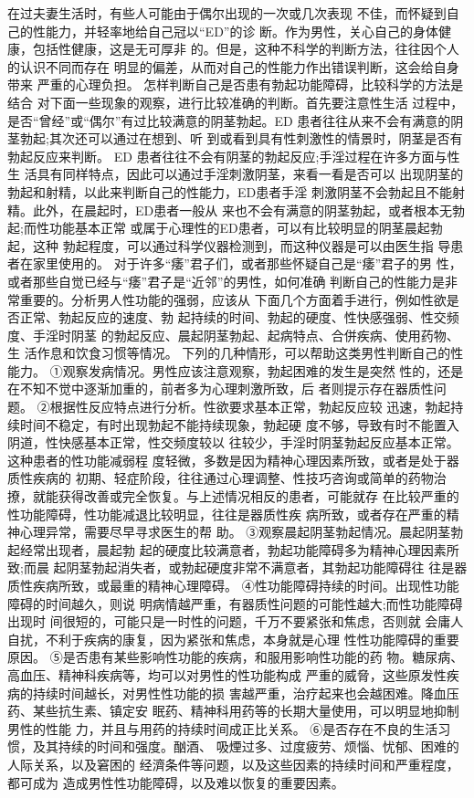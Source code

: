\documentclass[12pt,UTF8]{ctexbook}
\begin{document}
在过夫妻生活时，有些人可能由于偶尔出现的一次或几次表现
不佳，而怀疑到自己的性能力，并轻率地给自己冠以“ED”的诊
断。作为男性，关心自己的身体健康，包括性健康，这是无可厚非
的。但是，这种不科学的判断方法，往往因个人的认识不同而存在
明显的偏差，从而对自己的性能力作出错误判断，这会给自身带来
严重的心理负担。
怎样判断自己是否患有勃起功能障碍，比较科学的方法是结合
对下面一些现象的观察，进行比较准确的判断。首先要注意性生活
过程中，是否“曾经”或“偶尔”有过比较满意的阴茎勃起。ED
患者往往从来不会有满意的阴茎勃起;其次还可以通过在想到、听
到或看到具有性刺激性的情景时，阴茎是否有勃起反应来判断。
ED 患者往往不会有阴茎的勃起反应;手淫过程在许多方面与性生
活具有同样特点，因此可以通过手淫刺激阴茎，来看一看是否可以
出现阴茎的勃起和射精，以此来判断自己的性能力，ED患者手淫
刺激阴茎不会勃起且不能射精。此外，在晨起时，ED患者一般从
来也不会有满意的阴茎勃起，或者根本无勃起;而性功能基本正常
或属于心理性的ED患者，可以有比较明显的阴茎晨起勃起，这种
勃起程度，可以通过科学仪器检测到，而这种仪器是可以由医生指
导患者在家里使用的。
对于许多“痿”君子们，或者那些怀疑自己是“痿”君子的男
性，或者那些自觉已经与“痿”君子是“近邻”的男性，如何准确
判断自己的性能力是非常重要的。分析男人性功能的强弱，应该从
下面几个方面着手进行，例如性欲是否正常、勃起反应的速度、勃
起持续的时间、勃起的硬度、性快感强弱、性交频度、手淫时阴茎
的勃起反应、晨起阴茎勃起、起病特点、合併疾病、使用药物、生
活作息和饮食习惯等情况。
下列的几种情形，可以帮助这类男性判断自己的性能力。
①观察发病情况。男性应该注意观察，勃起困难的发生是突然
性的，还是在不知不觉中逐渐加重的，前者多为心理刺激所致，后
者则提示存在器质性问题。
②根据性反应特点进行分析。性欲要求基本正常，勃起反应较
迅速，勃起持续时间不稳定，有时出现勃起不能持续现象，勃起硬
度不够，导致有时不能置入阴道，性快感基本正常，性交频度较以
往较少，手淫时阴茎勃起反应基本正常。这种患者的性功能减弱程
度轻微，多数是因为精神心理因素所致，或者是处于器质性疾病的
初期、轻症阶段，往往通过心理调整、性技巧咨询或简单的药物治
撩，就能获得改善或完全恢复。与上述情况相反的患者，可能就存
在比较严重的性功能障碍，性功能减退比较明显，往往是器质性疾
病所致，或者存在严重的精神心理异常，需要尽早寻求医生的帮
助。
③观察晨起阴茎勃起情况。晨起阴茎勃起经常出现者，晨起勃
起的硬度比较满意者，勃起功能障碍多为精神心理因素所致;而晨
起阴茎勃起消失者，或勃起硬度非常不满意者，其勃起功能障碍往
往是器质性疾病所致，或最重的精神心理障碍。
④性功能障碍持续的时间。出现性功能障碍的时间越久，则说
明病情越严重，有器质性问题的可能性越大;而性功能障碍出现时
间很短的，可能只是一时性的问题，千万不要紧张和焦虑，否则就
会庸人自扰，不利于疾病的康复，因为紧张和焦虑，本身就是心理
性性功能障碍的重要原因。
⑤是否患有某些影响性功能的疾病，和服用影响性功能的药
物。糖尿病、高血压、精神科疾病等，均可以对男性的性功能构成
严重的威脅，这些原发性疾病的持续时间越长，对男性性功能的损
害越严重，治疗起来也会越困难。降血压药、某些抗生素、镇定安
眠药、精神科用药等的长期大量使用，可以明显地抑制男性的性能
力，并且与用药的持续时间成正比关系。
⑥是否存在不良的生活习惯，及其持续的时间和强度。酗酒、
吸煙过多、过度疲劳、烦惱、忧郁、困难的人际关系，以及窘困的
经濟条件等问题，以及这些因素的持续时间和严重程度，都可成为
造成男性性功能障碍，以及难以恢复的重要因素。
\end{document}
